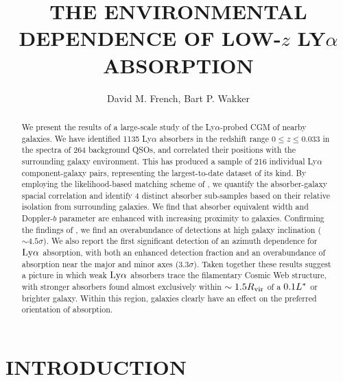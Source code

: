 \documentclass[twocolumn,tighten]{aastex62}
\begin{document}
\title{THE ENVIRONMENTAL DEPENDENCE OF LOW-$z$ LY$\alpha$ ABSORPTION}



\author{David M. French, Bart P. Wakker}


\begin{abstract}
We present the results of a large-scale study of the Ly$\alpha$-probed CGM of nearby galaxies. We have identified 1135 Ly$\alpha$ absorbers in the redshift range $0 \leq z \leq 0.033$ in the spectra of 264 background QSOs, and correlated their positions with the surrounding galaxy environment. This has produced a sample of 216 individual Ly$\alpha$ component-galaxy pairs, representing the largest-to-date dataset of its kind. By employing the likelihood-based matching scheme of \cite{french2017}, we quantify the absorber-galaxy spacial correlation and identify 4 distinct absorber sub-samples based on their relative isolation from surrounding galaxies. We find that absorber equivalent width and Doppler-$b$ parameter are enhanced with increasing proximity to galaxies. Confirming the findings of \cite{french2017}, we find an overabundance of detections at high galaxy inclination ($\sim 4.5 \sigma$). We also report the first significant detection of an azimuth dependence for $\rm Ly\alpha$ absorption, with both an enhanced detection fraction and an overabundance of absorption near the major and minor axes ($3.3 \sigma$). Taken together these results suggest a picture in which weak $\rm Ly\alpha$ absorbers trace the filamentary Cosmic Web structure, with stronger absorbers found almost exclusively within $\sim 1.5 R_{\rm vir}$ of a $0.1 L^{\**}$ or brighter galaxy. Within this region, galaxies clearly have an effect on the preferred orientation of absorption.

\end{abstract}




\section{INTRODUCTION}
\end{document}
